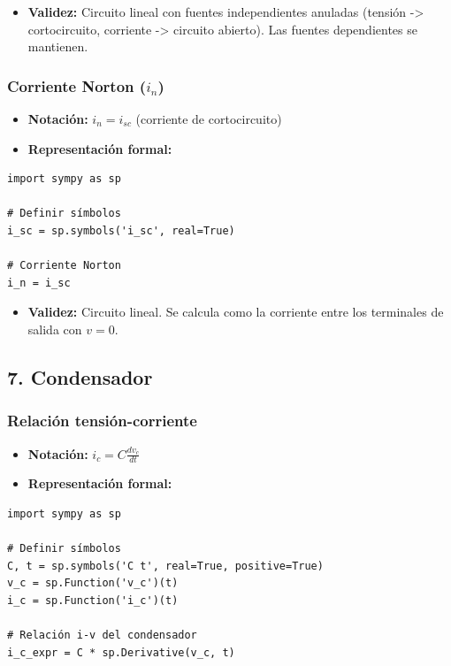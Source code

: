 \documentclass[11pt,a4paper]{article}
\begin{document}
\begin{itemize}[leftmargin=*,topsep=2pt,itemsep=1pt]
  \item \textbf{Validez:} Circuito lineal con fuentes independientes anuladas (tensión -> cortocircuito, corriente -> circuito abierto). Las fuentes dependientes se mantienen.
\end{itemize}


\subsubsection*{Corriente Norton ($i_n$)}


\begin{itemize}[leftmargin=*,topsep=2pt,itemsep=1pt]
  \item \textbf{Notación:} $i_n = i_{sc}$ (corriente de cortocircuito)
  \item \textbf{Representación formal:}
\end{itemize}


\begin{lstlisting}
import sympy as sp

# Definir símbolos
i_sc = sp.symbols('i_sc', real=True)

# Corriente Norton
i_n = i_sc
\end{lstlisting}


\begin{itemize}[leftmargin=*,topsep=2pt,itemsep=1pt]
  \item \textbf{Validez:} Circuito lineal. Se calcula como la corriente entre los terminales de salida con $v=0$.
\end{itemize}


\subsection*{7. Condensador}


\subsubsection*{Relación tensión-corriente}


\begin{itemize}[leftmargin=*,topsep=2pt,itemsep=1pt]
  \item \textbf{Notación:} $i_c = C \frac{dv_c}{dt}$
  \item \textbf{Representación formal:}
\end{itemize}


\begin{lstlisting}
import sympy as sp

# Definir símbolos
C, t = sp.symbols('C t', real=True, positive=True)
v_c = sp.Function('v_c')(t)
i_c = sp.Function('i_c')(t)

# Relación i-v del condensador
i_c_expr = C * sp.Derivative(v_c, t)
\end{lstlisting}
\end{document}
